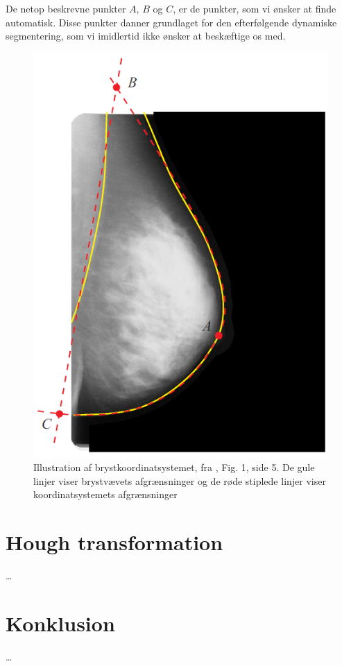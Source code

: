 \documentclass[11pt,a4paper]{article}
\begin{document}
De netop beskrevne punkter $A$, $B$ og $C$, er de punkter, som vi ønsker at finde automatisk. Disse punkter danner grundlaget for den efterfølgende dynamiske segmentering, som vi imidlertid ikke ønsker at beskæftige os med.

\begin{figure}
	\centering
		\includegraphics{grafik/brystkoordinatsystem.png}
	\caption{Illustration af brystkoordinatsystemet, fra \cite{brandtetal}, Fig. 1, side 5. De gule linjer viser brystvævets afgrænsninger og de røde stiplede linjer viser koordinatsystemets afgrænsninger}
	\label{fig:bks}
\end{figure}


\section{Hough transformation}
\ldots

\section{Konklusion}
\ldots



\end{document}
